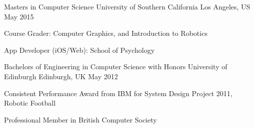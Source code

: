 \begin{cventries}
  \cventry
    {Masters in Computer Science}
    {University of Southern California}
    {Los Angeles, US}
    {May 2015}
    {
      \begin{cvitems}
        \item {Course Grader: Computer Graphics, and Introduction to Robotics}
        \item {App Developer (iOS/Web): School of Psychology}
      \end{cvitems}
    }
    {}
    {}
  \cventry
    {Bachelors of Engineering in Computer Science with Honors}
    {University of Edinburgh}
    {Edinburgh, UK}
    {May 2012}
    {
      \begin{cvitems}
        \item {Consistent Performance Award from IBM for System Design Project 2011, Robotic Football}
        \item {Professional Member in British Computer Society}        
      \end{cvitems}
    }
    {}
    {}

\end{cventries}
